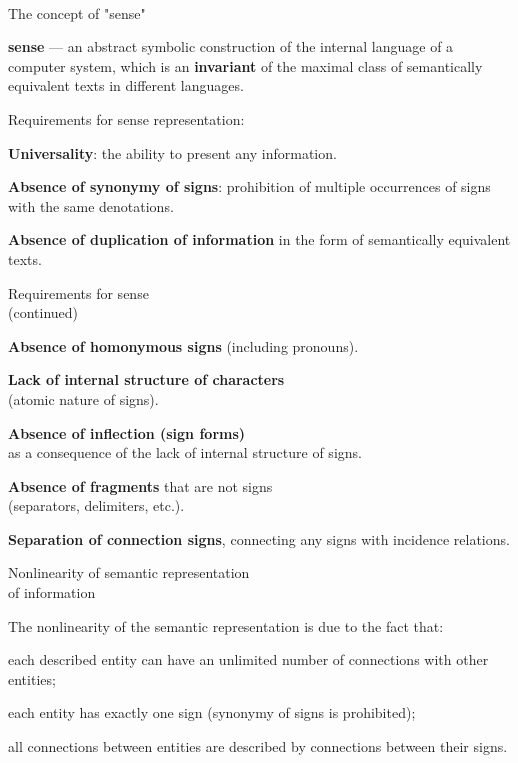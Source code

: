 \begin{frame}{\\The concept of "sense"}
	\topline
	\justifying
	
	\textbf{sense} --- an abstract symbolic construction of the internal language of a computer system, which is an \textbf{invariant} of the maximal class of semantically equivalent texts in different languages.
	
	\medskip
	Requirements for sense representation:
	\begin{textitemize}
		\item \textbf{Universality}: the ability to present any information.
		\item \textbf{Absence of synonymy of signs}: prohibition of multiple occurrences of signs with the same denotations.
		\item \textbf{Absence of duplication of information} in the form of semantically equivalent texts.
	\end{textitemize}
	
\end{frame}


\begin{frame}{Requirements for sense\\(continued)}
	\topline
	\justifying
	
	\begin{textitemize}
		\item \textbf{Absence of homonymous signs} (including pronouns).
		\item \textbf{Lack of internal structure of characters}\\
		(atomic nature of signs).
		\item \textbf{Absence of inflection (sign forms)}\\
		as a consequence of the lack of internal structure of signs.
		\item \textbf{Absence of fragments} that are not signs\\
		(separators, delimiters, etc.).
		\item \textbf{Separation of connection signs}, connecting any signs with incidence relations.
	\end{textitemize}
	
\end{frame}


\begin{frame}{Nonlinearity of semantic representation\\of information}
	\topline
	\justifying
	
	The nonlinearity of the semantic representation is due to the fact that:
	\begin{textitemize}
		\item each described entity can have an unlimited number of connections with other entities;
		\item each entity has exactly one sign (synonymy of signs is prohibited);
		\item all connections between entities are described by connections between their signs.
	\end{textitemize}
	
\end{frame}


